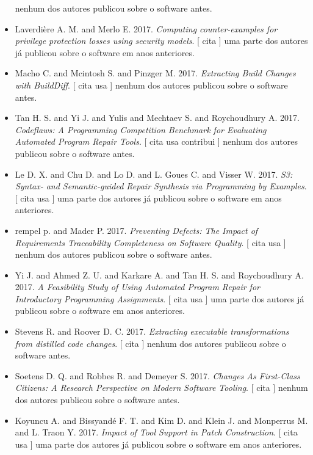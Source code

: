 \begin{itemize}
nenhum dos autores publicou sobre o software antes.
\item Laverdière A. M. and Merlo E.
      2017.
        \textit{ Computing counter-examples for privilege protection losses using security models}.
      [
          cita
      ]
uma parte dos autores já publicou sobre o software em anos anteriores.
\item Macho C. and Mcintosh S. and Pinzger M.
      2017.
        \textit{ Extracting Build Changes with BuildDiff}.
      [
          cita
          usa
      ]
nenhum dos autores publicou sobre o software antes.
\item Tan H. S. and Yi J. and Yulis and Mechtaev S. and Roychoudhury A.
      2017.
        \textit{ Codeflaws: A Programming Competition Benchmark for Evaluating Automated Program Repair Tools}.
      [
          cita
          usa
          contribui
      ]
nenhum dos autores publicou sobre o software antes.
\item Le D. X. and Chu D. and Lo D. and L. Goues C. and Visser W.
      2017.
        \textit{ S3: Syntax- and Semantic-guided Repair Synthesis via Programming by Examples}.
      [
          cita
          usa
      ]
uma parte dos autores já publicou sobre o software em anos anteriores.
\item rempel p. and Mader P.
      2017.
        \textit{ Preventing Defects: The Impact of Requirements Traceability Completeness on Software Quality}.
      [
          cita
          usa
      ]
nenhum dos autores publicou sobre o software antes.
\item Yi J. and Ahmed Z. U. and Karkare A. and Tan H. S. and Roychoudhury A.
      2017.
        \textit{ A Feasibility Study of Using Automated Program Repair for Introductory Programming Assignments}.
      [
          cita
          usa
      ]
uma parte dos autores já publicou sobre o software em anos anteriores.
\item Stevens R. and Roover D. C.
      2017.
        \textit{ Extracting executable transformations from distilled code changes}.
      [
          cita
      ]
nenhum dos autores publicou sobre o software antes.
\item Soetens D. Q. and Robbes R. and Demeyer S.
      2017.
        \textit{ Changes As First-Class Citizens: A Research Perspective on Modern Software Tooling}.
      [
          cita
      ]
nenhum dos autores publicou sobre o software antes.
\item Koyuncu A. and Bissyand{\'e} F. T. and Kim D. and Klein J. and Monperrus M. and L. Traon Y.
      2017.
        \textit{ Impact of Tool Support in Patch Construction}.
      [
          cita
          usa
      ]
uma parte dos autores já publicou sobre o software em anos anteriores.
\end{itemize}
